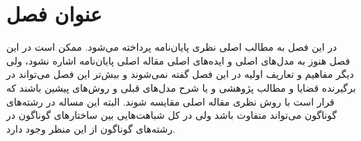 \chapter{عنوان فصل}\label{S2}
\pagestyle{plain}

در این فصل به مطالب اصلی نظری پایان‌نامه پرداخته می‌شود. ممکن است در این فصل هنوز به مدل‌های اصلی و ایده‌های اصلی مقاله اصلی پایان‌نامه اشاره نشود، ولی دیگر مفاهیم و تعاریف اولیه در این فصل گفته نمی‌شوند و بیش‌تر این فصل می‌تواند در برگیرنده قضایا و مطالب پژوهشی و یا شرح مدل‌های قبلی و روش‌های پیشین باشند که قرار است با روش نظری مقاله اصلی مقایسه شوند. البته این مساله در رشته‌های گوناگون می‌تواند متفاوت باشد ولی در کل شباهت‌هایی بین ساختارهای گوناگون در رشته‌های گوناگون از این منظر وجود دارد. 
























